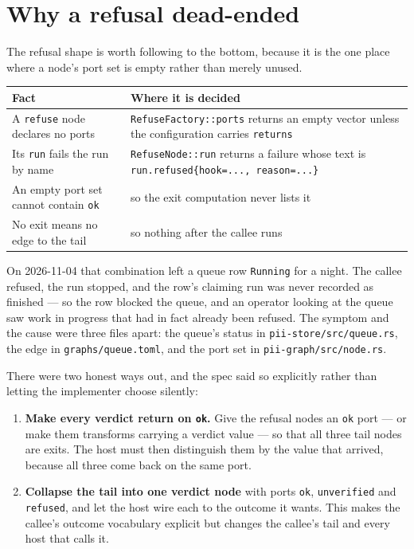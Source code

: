 \section{Why a refusal dead-ended}

The refusal shape is worth following to the bottom, because it is the one place where a node's port
set is empty rather than merely unused.

\begin{center}
\footnotesize
\begin{tabular}{@{}p{}p{}@{}}
	\toprule
	\textbf{Fact} & \textbf{Where it is decided} \\
	\midrule
	A \texttt{refuse} node declares no ports & \texttt{RefuseFactory::ports} returns an empty vector
	unless the configuration carries \texttt{returns} \\
	Its \texttt{run} fails the run by name & \texttt{RefuseNode::run} returns a failure whose text is
	\texttt{run.refused\{hook=..., reason=...\}} \\
	An empty port set cannot contain \texttt{ok} & so the exit computation never lists it \\
	No exit means no edge to the tail & so nothing after the callee runs \\
	\bottomrule
\end{tabular}
\end{center}

On 2026-11-04 that combination left a queue row \texttt{Running} for a night. The callee refused,
the run stopped, and the row's claiming run was never recorded as finished --- so the row blocked
the queue, and an operator looking at the queue saw work in progress that had in fact already been
refused. The symptom and the cause were three files apart: the queue's status in
\texttt{pii-store/src/queue.rs}, the edge in \texttt{graphs/queue.toml}, and the port set in
\texttt{pii-graph/src/node.rs}.

There were two honest ways out, and the spec said so explicitly rather than letting the implementer
choose silently:

\begin{enumerate}
	\item \textbf{Make every verdict return on \texttt{ok}.} Give the refusal nodes an \texttt{ok}
	port --- or make them transforms carrying a verdict value --- so that all three tail nodes are
	exits. The host must then distinguish them by the value that arrived, because all three come back
	on the same port.
	\item \textbf{Collapse the tail into one verdict node} with ports \texttt{ok},
	\texttt{unverified} and \texttt{refused}, and let the host wire each to the outcome it wants. This
	makes the callee's outcome vocabulary explicit but changes the callee's tail and every host that
	calls it.
\end{enumerate}

